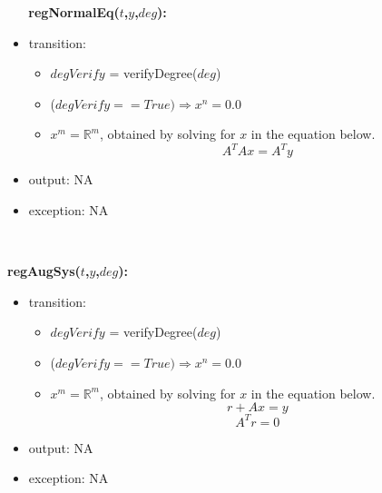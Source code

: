 \documentclass[12pt, titlepage]{article}
\begin{document}
~\newline
~\newline
\noindent \textbf{regNormalEq($t$,$y$,$deg$):}
\begin{itemize}
	\item transition: 
	\begin{itemize}
		\item $degVerify$ = verifyDegree($deg$)
		\item ($degVerify == True) \Longrightarrow  x ^ n = 0.0$ 
		\item $x ^ m = \mathbb{R}^m$, obtained by solving for $x$ in the 
		equation below.
		\begin{equation*}
		A^{T} Ax = A^{T}y
		\end{equation*}  
	\end{itemize} 
	\item output: NA
	\item exception: NA
\end{itemize}

~\newline
~\newline

\noindent \textbf{regAugSys($t$,$y$,$deg$):}
\begin{itemize}
\item transition: 
\begin{itemize}
	\item $degVerify$ = verifyDegree($deg$)
	\item ($degVerify == True) \Longrightarrow  x ^ n = 0.0$ 
	\item $x ^ m = \mathbb{R}^m$, obtained by solving for $x$ in the 
	equation below.
		\begin{equation*}
		r + Ax = y
		\end{equation*}
		\begin{equation*}
		A^{T} r = 0
		\end{equation*}
	\end{itemize}	
	\item output: NA 
		
	\item exception: NA
\end{itemize}
\end{document}
